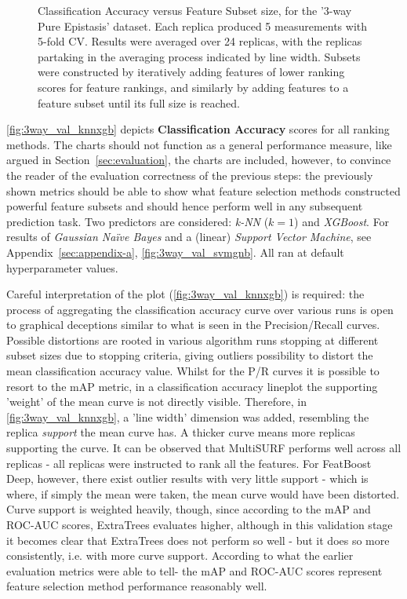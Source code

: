 \documentclass{article}
\begin{document}
\begin{figure}[ht]
\centering

\caption{Classification Accuracy versus Feature Subset size, for the '3-way  Pure  Epistasis' dataset. Each replica produced 5 measurements with 5-fold CV. Results were averaged over 24 replicas, with the replicas partaking in the averaging process indicated by line width. Subsets were constructed by iteratively adding features of lower ranking scores for feature rankings, and similarly by adding features to a feature subset until its full size is reached.}
\label{fig:3way_val_knnxgb}
\end{figure}

\autoref{fig:3way_val_knnxgb} depicts \textbf{Classification Accuracy} scores for all ranking methods. The charts should not function as a general performance measure, like argued in Section~\ref{sec:evaluation}, the charts are included, however, to convince the reader of the evaluation correctness of the previous steps: the previously shown metrics should be able to show what feature selection methods constructed powerful feature subsets and should hence perform well in any subsequent prediction task. Two predictors are considered: \textit{k-NN} ($k = 1$) and \textit{XGBoost}. For results of \textit{Gaussian Naïve Bayes} and  a (linear) \textit{Support Vector Machine}, see Appendix~\ref{sec:appendix-a}, \autoref{fig:3way_val_svmgnb}. All ran at default hyperparameter values.

Careful interpretation of the plot (\autoref{fig:3way_val_knnxgb}) is required: the process of aggregating the classification accuracy curve over various runs is open to graphical deceptions similar to what is seen in the Precision/Recall curves. Possible distortions are rooted in various algorithm runs stopping at different subset sizes due to stopping criteria, giving outliers possibility to distort the mean classification accuracy value. Whilst for the P/R curves it is possible to resort to the mAP metric, in a classification accuracy lineplot the supporting 'weight' of the mean curve is not directly visible. Therefore, in \autoref{fig:3way_val_knnxgb}, a 'line width' dimension was added, resembling the replica \textit{support} the mean curve has. A thicker curve means more replicas supporting the curve. It can be observed that MultiSURF performs well across all replicas - all replicas were instructed to rank all the features. For FeatBoost Deep, however, there exist outlier results with very little support - which is where, if simply the mean were taken, the mean curve would have been distorted. Curve support is weighted heavily, though, since according to the mAP and ROC-AUC scores, ExtraTrees evaluates higher, although in this validation stage it becomes clear that ExtraTrees does not perform so well - but it does so more consistently, i.e. with more curve support. According to what the earlier evaluation metrics were able to tell- the mAP and ROC-AUC scores represent feature selection method performance reasonably well.
\end{document}
